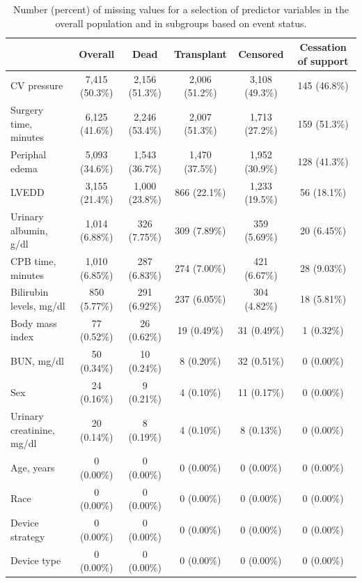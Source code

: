 \documentclass{article}
\begin{document}
\begin{table} 
 \caption{Number (percent) of missing values for a selection of predictor variables in the overall population and in subgroups based on event status.} 
\label{tbl_missingness} 
 
\begin{tabular}{lccccc}
\toprule
 & Overall & Dead & Transplant & Censored & Cessation of support \\ 
\midrule
CV pressure & 7,415 (50.3\%) & 2,156 (51.3\%) & 2,006 (51.2\%) & 3,108 (49.3\%) & 145 (46.8\%) \\ 
Surgery time, minutes & 6,125 (41.6\%) & 2,246 (53.4\%) & 2,007 (51.3\%) & 1,713 (27.2\%) & 159 (51.3\%) \\ 
Periphal edema & 5,093 (34.6\%) & 1,543 (36.7\%) & 1,470 (37.5\%) & 1,952 (30.9\%) & 128 (41.3\%) \\ 
LVEDD & 3,155 (21.4\%) & 1,000 (23.8\%) & 866 (22.1\%) & 1,233 (19.5\%) & 56 (18.1\%) \\ 
Urinary albumin, g/dl & 1,014 (6.88\%) & 326 (7.75\%) & 309 (7.89\%) & 359 (5.69\%) & 20 (6.45\%) \\ 
CPB time, minutes & 1,010 (6.85\%) & 287 (6.83\%) & 274 (7.00\%) & 421 (6.67\%) & 28 (9.03\%) \\ 
Bilirubin levels, mg/dl & 850 (5.77\%) & 291 (6.92\%) & 237 (6.05\%) & 304 (4.82\%) & 18 (5.81\%) \\ 
Body mass index & 77 (0.52\%) & 26 (0.62\%) & 19 (0.49\%) & 31 (0.49\%) & 1 (0.32\%) \\ 
BUN, mg/dl & 50 (0.34\%) & 10 (0.24\%) & 8 (0.20\%) & 32 (0.51\%) & 0 (0.00\%) \\ 
Sex & 24 (0.16\%) & 9 (0.21\%) & 4 (0.10\%) & 11 (0.17\%) & 0 (0.00\%) \\ 
Urinary creatinine, mg/dl & 20 (0.14\%) & 8 (0.19\%) & 4 (0.10\%) & 8 (0.13\%) & 0 (0.00\%) \\ 
Age, years & 0 (0.00\%) & 0 (0.00\%) & 0 (0.00\%) & 0 (0.00\%) & 0 (0.00\%) \\ 
Race & 0 (0.00\%) & 0 (0.00\%) & 0 (0.00\%) & 0 (0.00\%) & 0 (0.00\%) \\ 
Device strategy & 0 (0.00\%) & 0 (0.00\%) & 0 (0.00\%) & 0 (0.00\%) & 0 (0.00\%) \\ 
Device type & 0 (0.00\%) & 0 (0.00\%) & 0 (0.00\%) & 0 (0.00\%) & 0 (0.00\%) \\ 
\bottomrule
\end{tabular} 
 \end{table}

\clearpage
\end{document}
